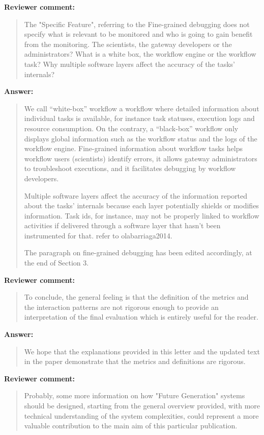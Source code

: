 \documentclass[a4]{article}
\newenvironment{review}%
{\textbf{Reviewer comment:}\begin{quote}}%
{\end{quote}}%
\newenvironment{answer}%
{\textbf{Answer:}\begin{small}\begin{quote}}%
{\end{quote}\end{small}}%
\newcommand{\todo}[1]{\color{red}#1\color{black}}
\begin{document}
\begin{review}
  The "Specific Feature", referring to the Fine-grained debugging does
  not specify what is relevant to be monitored and who is going to
  gain benefit from the monitoring. The scientists, the gateway
  developers or the administrators? What is a white box, the workflow
  engine or the workflow task? Why multiple software layers affect the
  accuracy of the tasks' internals?
\end{review}

\begin{answer}
  We call ``white-box'' workflow a workflow
  where detailed information about individual tasks is available,
  for instance task statuses, execution logs and resource
  consumption. On the contrary, a ``black-box'' workflow only
  displays global information such as the workflow status and the
  logs of the workflow engine. Fine-grained information about
  workflow tasks helps workflow users (scientists)
  identify errors, it allows gateway administrators to troubleshoot
  executions, and it facilitates debugging by workflow
  developers.
  
  Multiple software layers affect the accuracy of the information
  reported about the tasks' internals because each layer potentially
  shields or modifies information. Task ids, for instance, may not
  be properly linked to workflow activities if delivered through a
  software layer that hasn't been instrumented for that. \todo{refer
    to olabarriaga2014}.
  
  The paragraph on fine-grained debugging has been edited accordingly, at the end of Section 3.
\end{answer}

\begin{review}
  To conclude, the general feeling is that the definition of the
  metrics and the interaction patterns are not rigorous enough to
  provide an interpretation of the final evaluation which is entirely
  useful for the reader.
\end{review}

\begin{answer}
  We hope that the explanations provided in this letter and the
  updated text in the paper demonstrate that the metrics and
  definitions are rigorous.
\end{answer}

\begin{review}
  Probably, some more information on how "Future Generation" systems
  should be designed, starting from the general overview provided,
  with more technical understanding of the system complexities, could
  represent a more valuable contribution to the main aim of this
  particular publication.
\end{review}
\end{document}
